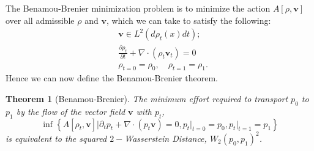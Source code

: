 \documentclass[12pt]{article}
\theoremstyle{plain}
\newtheorem{thm}{Theorem}[section]
\numberwithin{equation}{section}
\begin{document}
The Benamou-Brenier minimization problem is to minimize the action $A[\rho,\mathbf{v}]$ over all admissible $\rho$ and $\mathbf{v}$, which we can take to satisfy the following:
\begin{align*}
  &\mathbf{v}\in L^2(d\rho_t(x)dt); \\
  &\frac{\partial \rho_t}{\partial t} + \nabla \cdot (\rho_t\mathbf{v}_t) = 0 \\
  &\rho_{t=0} = \rho_0,\quad \rho_{t=1} = \rho_1.
\end{align*}
Hence we can now define the Benamou-Brenier theorem.
\begin{thm}[Benamou-Brenier]\label{thm:benamou}
	The minimum effort required to transport $p_0$ to $p_1$ by the flow of the vector field $\mathbf{v}$ with $p_t$,
	\begin{equation}
		\inf\left\{A[\rho_t,\mathbf{v}]\bigg\vert\partial_t p_t + \nabla \cdot (p_t \mathbf{v}) = 0,p_t\vert_{t=0}=p_0, p_t\vert_{t=1}=p_1\right\}
	\end{equation} 
	is equivalent to the squared $2-$Wasserstein Distance, $W_2(p_0,p_1)^2$.
\end{thm}
\end{document}
